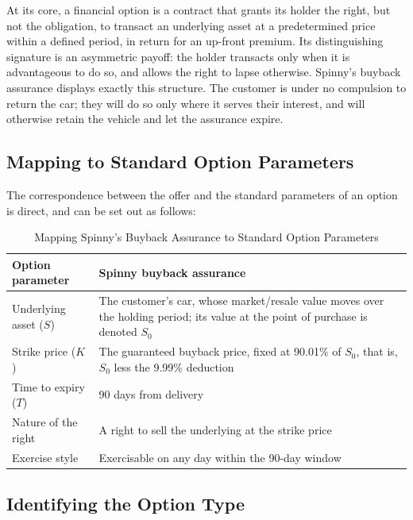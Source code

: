 \documentclass[11pt, a4paper]{article}
\begin{document}
At its core, a financial option is a contract that grants its holder the right, but not the obligation, to transact an underlying asset at a predetermined price within a defined period, in return for an up-front premium. Its distinguishing signature is an asymmetric payoff: the holder transacts only when it is advantageous to do so, and allows the right to lapse otherwise. Spinny's buyback assurance displays exactly this structure. The customer is under no compulsion to return the car; they will do so only where it serves their interest, and will otherwise retain the vehicle and let the assurance expire. 

\subsection{Mapping to Standard Option Parameters}

The correspondence between the offer and the standard parameters of an option is direct, and can be set out as follows:

\begin{table}[H]
\centering
\caption{Mapping Spinny's Buyback Assurance to Standard Option Parameters}
\label{tab:spinny-option-parameters}
\begin{tabular}{p{} p{}}
\toprule
\textbf{Option parameter} & \textbf{Spinny buyback assurance} \\
\midrule
Underlying asset ($S$) & The customer's car, whose market/resale value moves over the holding period; its value at the point of purchase is denoted $S_0$ \\[0.8em]
Strike price ($K$) & The guaranteed buyback price, fixed at 90.01\% of $S_0$, that is, $S_0$ less the 9.99\% deduction \\[0.8em]
Time to expiry ($T$) & 90 days from delivery \\[0.8em]
Nature of the right & A right to sell the underlying at the strike price \\[0.8em]
Exercise style & Exercisable on any day within the 90-day window \\
\bottomrule
\end{tabular}
\end{table}


\subsection{Identifying the Option Type}
\end{document}
